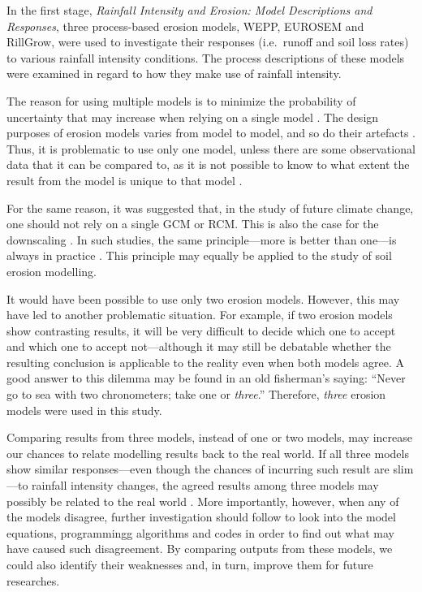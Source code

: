 In the first stage, \textsl{Rainfall Intensity and Erosion: Model Descriptions
and Responses}, three process-based erosion models, WEPP, EUROSEM and RillGrow,
were used to investigate their responses (i.e.\ runoff and soil loss rates) to
various rainfall intensity conditions. The process descriptions of these models
were examined in regard to how they make use of rainfall intensity.

The reason for using multiple models is to minimize the probability of
uncertainty that may increase when relying on a single model
\citep{ipcc2001-881}. The design purposes of erosion models varies from model to
model, and so do their artefacts \citep{favis-mortlock1998-141,jetten1999-521}.
Thus, it is problematic to use only one model, unless there are some
observational data that it can be compared to, as it is not possible to know to
what extent the result from the model is unique to that model
\citep{favis-mortlock1998-141,jetten1999-521}.

For the same reason, it was suggested that, in the study of future climate
change, one should not rely on a single GCM or RCM. This is also the case for
the downscaling \citep{mearns2003,wilby2004}. In such studies, the same
principle---more is better than one---is always in practice \citep{wilby2004}.
This principle may equally be applied to the study of soil erosion modelling.

It would have been possible to use only two erosion models. However, this may
have led to another problematic situation. For example, if two erosion models
show contrasting results, it will be very difficult to decide which one to
accept and which one to accept not---although it may still be debatable
whether the resulting conclusion is applicable to the reality even when both
models agree. A good answer to this dilemma may be found in an old fisherman's
saying: ``Never go to sea with two chronometers; take one or \emph{three}.''
Therefore, \emph{three} erosion models were used in this study.

Comparing results from three models, instead of one or two models, may increase
our chances to relate modelling results back to the real world.
If all three models show similar responses---even though the chances of
incurring such result are slim---to rainfall intensity changes, the agreed
results among three models may possibly be related to the real world
\citep{araujo2007-42}.
More importantly, however, when any of the models disagree, further
investigation should follow to look into the model equations, programmingg
algorithms and codes in order to find out what may have caused such
disagreement. By comparing outputs from these models, we could also identify
their weaknesses and, in turn, improve them for future researches.

